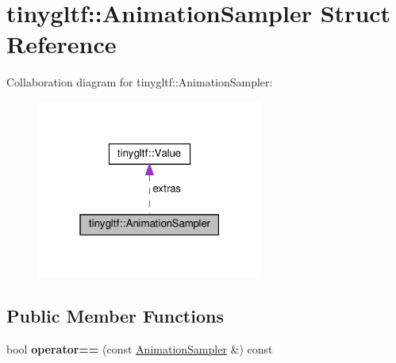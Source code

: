 \hypertarget{structtinygltf_1_1AnimationSampler}{}\section{tinygltf\+:\+:Animation\+Sampler Struct Reference}
\label{structtinygltf_1_1AnimationSampler}


Collaboration diagram for tinygltf\+:\+:Animation\+Sampler\+:\nopagebreak
\begin{figure}[H]
\begin{center}
\leavevmode
\includegraphics[width=211pt]{structtinygltf_1_1AnimationSampler__coll__graph}
\end{center}
\end{figure}
\subsection*{Public Member Functions}
\begin{DoxyCompactItemize}
\item 
\mbox{\label{structtinygltf_1_1AnimationSampler_a9558f00a692e27428ea55b678d9292ad}} 
bool {\bfseries operator==} (const \hyperlink{structtinygltf_1_1AnimationSampler}{Animation\+Sampler} \&) const
\end{DoxyCompactItemize}
